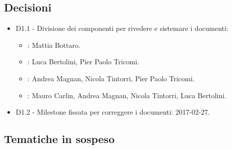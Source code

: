 \documentclass[a4paper,titlepage]{article}
\begin{document}
 \subsection{Decisioni}
 \begin{itemize}
  \item D1.1 - Divisione dei componenti per rivedere e sistemare i documenti:
  	\begin{itemize}
  		\item \NPdocRR{}: Mattia Bottaro.
  		\item \PPdocRR{}: Luca Bertolini, Pier Paolo Tricomi.
  		\item \PQdocRR{}: Andrea Magnan, Nicola Tintorri, Pier Paolo Tricomi.
  		\item \ARdocRR{}: Mauro Carlin, Andrea Magnan, Nicola Tintorri, Luca Bertolini.
  	\end{itemize}
  \item D1.2 - Milestone fissata per correggere i documenti: 2017-02-27.
 \end{itemize}

\subsection{Tematiche in sospeso}
\end{document}

